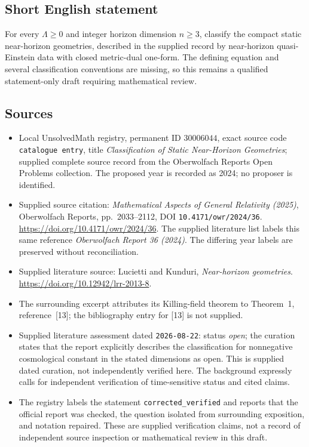 \documentclass[11pt]{article}
\begin{document}
\subsection{Short English statement}
For every \(\Lambda\geq0\) and integer horizon dimension \(n\geq3\), classify the compact static near-horizon geometries, described in the supplied record by near-horizon quasi-Einstein data with closed metric-dual one-form. The defining equation and several classification conventions are missing, so this remains a qualified statement-only draft requiring mathematical review.
\subsection{Sources}
\begin{itemize}
\item Local UnsolvedMath registry, permanent ID \(30006044\), exact source code \texttt{catalogue entry}, title \emph{Classification of Static Near-Horizon Geometries}; supplied complete source record from the Oberwolfach Reports Open Problems collection. The proposed year is recorded as 2024; no proposer is identified.
\item Supplied source citation: \emph{Mathematical Aspects of General Relativity (2025)}, Oberwolfach Reports, pp.~2033--2112, DOI \texttt{10.4171/owr/2024/36}. \url{https://doi.org/10.4171/owr/2024/36}. The supplied literature list labels this same reference \emph{Oberwolfach Report 36 (2024)}. The differing year labels are preserved without reconciliation.
\item Supplied literature source: Lucietti and Kunduri, \emph{Near-horizon geometries}. \url{https://doi.org/10.12942/lrr-2013-8}.
\item The surrounding excerpt attributes its Killing-field theorem to Theorem~1, reference~[13]; the bibliography entry for [13] is not supplied.
\item Supplied literature assessment dated \texttt{2026-08-22}: status \emph{open}; the curation states that the report explicitly describes the classification for nonnegative cosmological constant in the stated dimensions as open. This is supplied dated curation, not independently verified here. The background expressly calls for independent verification of time-sensitive status and cited claims.
\item The registry labels the statement \texttt{corrected\_verified} and reports that the official report was checked, the question isolated from surrounding exposition, and notation repaired. These are supplied verification claims, not a record of independent source inspection or mathematical review in this draft.
\end{itemize}
\end{document}
